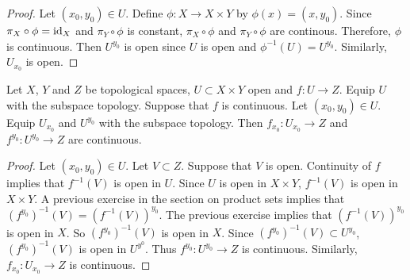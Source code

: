 \documentclass{book}
\begin{document}
	\begin{proof}
		Let $(x_0, y_0) \in U$. Define $\phi: X \rightarrow X \times Y$ by $\phi(x) = (x, y_0)$. Since $\pi_X \circ \phi = \operatorname{id}_X$ and $\pi_Y \circ \phi$ is constant, $\pi_X \circ \phi$ and $\pi_Y \circ \phi$ are continous. Therefore, $\phi$ is continuous. Then $U^{y_0}$ is open since $U$ is open and $\phi^{-1}(U) = U^{y_0}$. Similarly, $U_{x_0}$ is open.
	\end{proof}

	\begin{ex} 
		Let $X$, $Y$ and $Z$ be topological spaces, $U \subset X \times Y$ open and $f: U \rightarrow Z$. Equip $U$ with the subspace topology. Suppose that $f$ is continuous. Let $(x_0, y_0) \in U$. Equip $U_{x_0}$ and $U^{y_0}$ with the subspace topology. Then $f_{x_0}:U_{x_0} \rightarrow Z$ and $f^{y_0}: U^{y_0} \rightarrow Z$ are continuous.
	\end{ex}

	\begin{proof}
		Let $(x_0, y_0) \in U$. Let $V \subset Z$. Suppose that $V$ is open. Continuity of $f$ implies that $f^{-1}(V)$ is open in $U$. Since $U$ is open in $X \times Y$, $f^{-1}(V)$ is open in $X \times Y$. A previous exercise in the section on product sets implies that $(f^{y_0})^{-1}(V) = (f^{-1}(V))^{y_0}$. The previous exercise implies that $(f^{-1}(V))^{y_0}$ is open in $X$. So $(f^{y_0})^{-1}(V)$ is open in $X$. Since $(f^{y_0})^{-1}(V) \subset U^{y_0}$, $(f^{y_0})^{-1}(V)$ is open in $U^{y^0}$. Thus $f^{y_0}: U^{y_0} \rightarrow Z$ is continuous. Similarly, $f_{x_0}: U_{x_0} \rightarrow Z$ is continuous.
	\end{proof}
	
	
	
	
	
	
	
	
	
	
	
	
	
	
	
	
	
	
	
	
	
	
	
	
	
	
	
	
	
	
	
	
	
	
	
	
	
	
	
\end{document}
